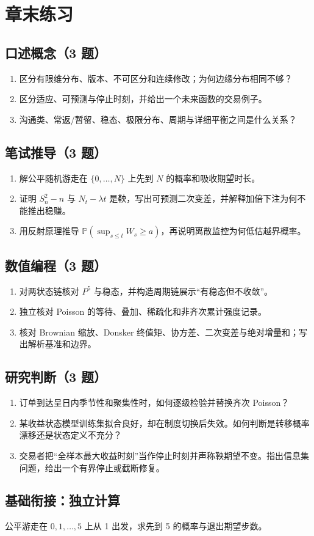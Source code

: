 \section*{章末练习}
\begingroup\small
\subsection*{口述概念（3 题）}
\begin{enumerate}[nosep,leftmargin=*]
  \item 区分有限维分布、版本、不可区分和连续修改；为何边缘分布相同不够？
  \item 区分适应、可预测与停止时刻，并给出一个未来函数的交易例子。
  \item 沟通类、常返/暂留、稳态、极限分布、周期与详细平衡之间是什么关系？
\end{enumerate}
\subsection*{笔试推导（3 题）}
\begin{enumerate}[nosep,leftmargin=*,start=4]
  \item 解公平随机游走在 $\{0,\ldots,N\}$ 上先到 $N$ 的概率和吸收期望时长。
  \item 证明 $S_n^2-n$ 与 $N_t-\lambda t$ 是鞅，写出可预测二次变差，并解释加倍下注为何不能推出稳赚。
  \item 用反射原理推导 $\mathbb P(\sup_{s\le t}W_s\ge a)$，再说明离散监控为何低估越界概率。
\end{enumerate}
\subsection*{数值编程（3 题）}
\begin{enumerate}[nosep,leftmargin=*,start=7]
  \item 对两状态链核对 $P^5$ 与稳态，并构造周期链展示“有稳态但不收敛”。
  \item 独立核对 Poisson 的等待、叠加、稀疏化和非齐次累计强度记录。
  \item 核对 Brownian 缩放、Donsker 终值矩、协方差、二次变差与绝对增量和；写出解析基准和边界。
\end{enumerate}
\subsection*{研究判断（3 题）}
\begin{enumerate}[nosep,leftmargin=*,start=10]
  \item 订单到达呈日内季节性和聚集性时，如何逐级检验并替换齐次 Poisson？
  \item 某收益状态模型训练集拟合良好，却在制度切换后失效。如何判断是转移概率漂移还是状态定义不充分？
  \item 交易者把“全样本最大收益时刻”当作停止时刻并声称鞅期望不变。指出信息集问题，给出一个有界停止或截断修复。
\end{enumerate}
\endgroup


\MFQMappedUpperChElevenQuestions

\subsection*{基础衔接：独立计算}
公平游走在 $0,1,\ldots,5$ 上从 1 出发，求先到 5 的概率与退出期望步数。
